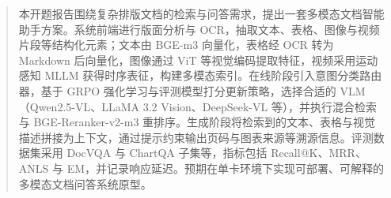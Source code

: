 

\begin{abstract}
  本开题报告围绕复杂排版文档的检索与问答需求，提出一套多模态文档智能助手方案。系统前端进行版面分析与 OCR，抽取文本、表格、图像与视频片段等结构化元素；文本由 BGE-m3 向量化，表格经 OCR 转为 Markdown 后向量化，图像通过 ViT 等视觉编码提取特征，视频采用运动感知 MLLM 获得时序表征，构建多模态索引。在线阶段引入意图分类路由器，基于 GRPO 强化学习与评测模型打分更新策略，选择合适的 VLM（Qwen2.5-VL、LLaMA 3.2 Vision、DeepSeek-VL 等），并执行混合检索与 BGE-Reranker-v2-m3 重排序。生成阶段将检索到的文本、表格与视觉描述拼接为上下文，通过提示约束输出页码与图表来源等溯源信息。评测数据集采用 DocVQA 与 ChartQA 子集等，指标包括 Recall@K、MRR、ANLS 与 EM，并记录响应延迟。预期在单卡环境下实现可部署、可解释的多模态文档问答系统原型。

\end{abstract}

